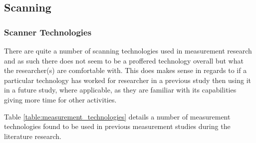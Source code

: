 \documentclass{mscreport}
\begin{document}
\subsection{Scanning}


\subsubsection{Scanner Technologies}

\noindent
There are quite a number of scanning technologies used in measurement research and as such there does not seem to be a proffered technology overall but what the researcher(s) are comfortable with. This does makes sense in regards to if a particular technology has worked for researcher in a previous study then using it in a future study, where applicable, as they are familiar with its capabilities giving more time for other activities.

\vspace{0.3cm} \noindent
Table \ref{table:measurement_technologies} details a number of measurement technologies found to be used in previous measurement studies during the literature research.

\clearpage
\newpage
\end{document}
